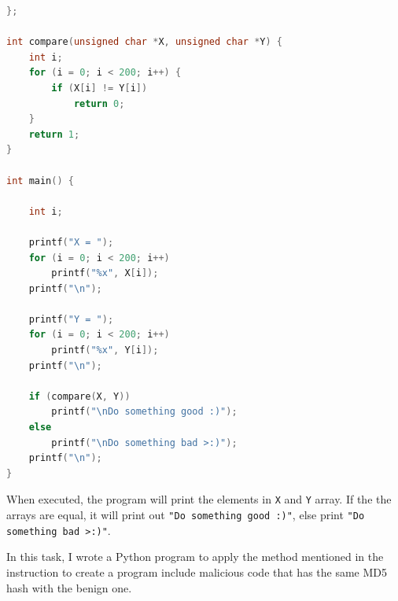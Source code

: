 \documentclass{article}
\begin{document}
\begin{lstlisting}[language=c]
};

int compare(unsigned char *X, unsigned char *Y) {
    int i;
    for (i = 0; i < 200; i++) {
        if (X[i] != Y[i])
            return 0;
    }
    return 1;
}

int main() {

    int i;

    printf("X = ");
    for (i = 0; i < 200; i++)
        printf("%x", X[i]);
    printf("\n");

    printf("Y = ");
    for (i = 0; i < 200; i++)
        printf("%x", Y[i]);
    printf("\n");

    if (compare(X, Y))
        printf("\nDo something good :)");
    else
        printf("\nDo something bad >:)");
    printf("\n");
}
\end{lstlisting}

When executed, the program will print the elements in \texttt{X} and \texttt{Y}
array. If the the arrays are equal, it will print out \texttt{"Do something good :)"},
else print \texttt{"Do something bad >:)"}.

In this task, I wrote a Python program to apply the method mentioned in the instruction
to create a program include malicious code that has the same MD5 hash with the
benign one.
\end{document}
